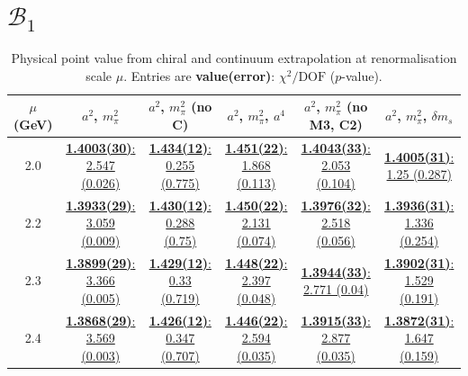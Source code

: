 \documentclass[12pt]{extarticle}
\begin{document}
\section{$\mathcal{B}_1$}
\begin{table}[h!]
\begin{center}
\begin{tabular}{|c|c|c|c|c|c|}
\hline
$\mu$ (GeV) & $a^2$, $m_\pi^2$& $a^2$, $m_\pi^2$ (no C)& $a^2$, $m_\pi^2$, $a^4$& $a^2$, $m_\pi^2$ (no M3, C2)& $a^2$, $m_\pi^2$, $\delta m_s$\\
\hline
2.0& \hyperlink{VVpAA/NPR/bag_a2m2_20.pdf.1}{\textbf{1.4003(30)}: 2.547 (0.026)} & \hyperlink{VVpAA/NPR/bag_a2m2noC_20.pdf.1}{\textbf{1.434(12)}: 0.255 (0.775)} & \hyperlink{VVpAA/NPR/bag_a2a4m2_20.pdf.1}{\textbf{1.451(22)}: 1.868 (0.113)} & \hyperlink{VVpAA/NPR/bag_a2m2mcut_20.pdf.1}{\textbf{1.4043(33)}: 2.053 (0.104)} & \hyperlink{VVpAA/NPR/bag_a2m2delm_20.pdf.1}{\textbf{1.4005(31)}: 1.25 (0.287)}\\
2.2& \hyperlink{VVpAA/NPR/bag_a2m2_22.pdf.1}{\textbf{1.3933(29)}: 3.059 (0.009)} & \hyperlink{VVpAA/NPR/bag_a2m2noC_22.pdf.1}{\textbf{1.430(12)}: 0.288 (0.75)} & \hyperlink{VVpAA/NPR/bag_a2a4m2_22.pdf.1}{\textbf{1.450(22)}: 2.131 (0.074)} & \hyperlink{VVpAA/NPR/bag_a2m2mcut_22.pdf.1}{\textbf{1.3976(32)}: 2.518 (0.056)} & \hyperlink{VVpAA/NPR/bag_a2m2delm_22.pdf.1}{\textbf{1.3936(31)}: 1.336 (0.254)}\\
2.3& \hyperlink{VVpAA/NPR/bag_a2m2_23.pdf.1}{\textbf{1.3899(29)}: 3.366 (0.005)} & \hyperlink{VVpAA/NPR/bag_a2m2noC_23.pdf.1}{\textbf{1.429(12)}: 0.33 (0.719)} & \hyperlink{VVpAA/NPR/bag_a2a4m2_23.pdf.1}{\textbf{1.448(22)}: 2.397 (0.048)} & \hyperlink{VVpAA/NPR/bag_a2m2mcut_23.pdf.1}{\textbf{1.3944(33)}: 2.771 (0.04)} & \hyperlink{VVpAA/NPR/bag_a2m2delm_23.pdf.1}{\textbf{1.3902(31)}: 1.529 (0.191)}\\
2.4& \hyperlink{VVpAA/NPR/bag_a2m2_24.pdf.1}{\textbf{1.3868(29)}: 3.569 (0.003)} & \hyperlink{VVpAA/NPR/bag_a2m2noC_24.pdf.1}{\textbf{1.426(12)}: 0.347 (0.707)} & \hyperlink{VVpAA/NPR/bag_a2a4m2_24.pdf.1}{\textbf{1.446(22)}: 2.594 (0.035)} & \hyperlink{VVpAA/NPR/bag_a2m2mcut_24.pdf.1}{\textbf{1.3915(33)}: 2.877 (0.035)} & \hyperlink{VVpAA/NPR/bag_a2m2delm_24.pdf.1}{\textbf{1.3872(31)}: 1.647 (0.159)}\\
\hline
\end{tabular}
\caption{Physical point value from chiral and continuum extrapolation at renormalisation scale $\mu$. Entries are \textbf{value(error)}: $\chi^2/\text{DOF}$ ($p$-value).}
\end{center}
\end{table}
\end{document}
